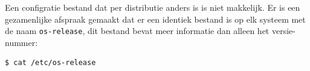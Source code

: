 Een configratie bestand dat per distributie anders is is niet makkelijk. Er is een gezamenlijke afspraak gemaakt dat er een identiek bestand is op elk systeem met de naam \texttt{os-release}, dit bestand bevat meer informatie dan alleen het versie-nummer:
\begin{lstlisting}[language=bash]
$ cat /etc/os-release
\end{lstlisting}

